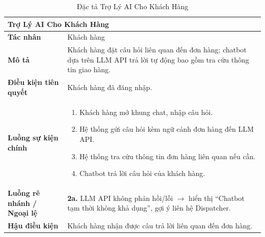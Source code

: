 \begin{table}[H]
  \centering
  \begin{tabularx}{\textwidth}{|l|X|}
    \hline
    \multicolumn{2}{|l|}{\textbf{Trợ Lý AI Cho Khách Hàng}} \\
    \hline
    \textbf{Tác nhân}           & Khách hàng \\ \hline
    \textbf{Mô tả}              & Khách hàng đặt câu hỏi liên quan đến đơn hàng; chatbot dựa trên LLM API trả lời tự động bao gồm tra cứu thông tin giao hàng. \\ \hline
    \textbf{Điều kiện tiên quyết} & Khách hàng đã đăng nhập. \\ \hline
    \textbf{Luồng sự kiện chính} &
      \begin{enumerate}[leftmargin=*, nosep, topsep=0pt]
        \item Khách hàng mở khung chat, nhập câu hỏi.
        \item Hệ thống gửi câu hỏi kèm ngữ cảnh đơn hàng đến LLM API.
        \item Hệ thống tra cứu thông tin đơn hàng liên quan nếu cần.
        \item Chatbot trả lời câu hỏi của khách hàng.
      \end{enumerate} \\ \hline
    \textbf{Luồng rẽ nhánh / Ngoại lệ} &
      \textbf{2a.} LLM API không phản hồi/lỗi $\rightarrow$ hiển thị ``Chatbot tạm thời không khả dụng'', gợi ý liên hệ Dispatcher. \\ \hline
    \textbf{Hậu điều kiện}      & Khách hàng nhận được câu trả lời liên quan đến đơn hàng. \\
    \hline
  \end{tabularx}
  \caption{Đặc tả Trợ Lý AI Cho Khách Hàng}
  \label{tab:uc11}
\end{table}

